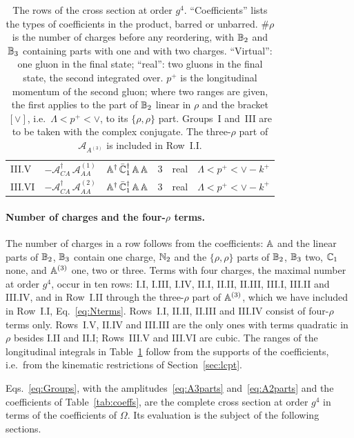 \begin{table}[t]
\begin{tabular}{@{}l l l c l l@{}}
III.V & $-\mathcal A^{\dagger}_{CA}\,\mathcal A^{(1)}_{AA}$ & $\mathbb{A}^\dagger\,\bar{\mathbb{C}}_1^\dagger\,\mathbb{A}\,\mathbb{A}$ & 3 & real & $\Lambda<p^+<\vee-k^+$\\
III.VI & $-\mathcal A^{\dagger}_{CA}\,\mathcal A^{(2)}_{AA}$ & $\mathbb{A}^\dagger\,\bar{\mathbb{C}}_1^\dagger\,\mathbb{A}\,\mathbb{A}$ & 3 & real & $\Lambda<p^+<\vee-k^+$\\
\bottomrule
\end{tabular}
\caption{The rows of the cross section at order $g^4$. ``Coefficients'' lists the types of coefficients in the product, barred or unbarred. $\#\rho$ is the number of charges before any reordering, with $\mathbb{B}_2$ and $\mathbb{B}_3$ containing parts with one and with two charges. ``Virtual'': one gluon in the final state; ``real'': two gluons in the final state, the second integrated over. $p^+$ is the longitudinal momentum of the second gluon; where two ranges are given, the first applies to the part of $\mathbb{B}_2$ linear in $\rho$ and the bracket $[\vee]$, i.e.\ $\Lambda<p^+<\vee$, to its $\{\rho,\rho\}$ part. Groups~I and~III are to be taken with the complex conjugate. The three-$\rho$ part of $\mathcal A_{A^{(3)}}$ is included in Row~I.I.}
\label{tab:rows}
\end{table}

\paragraph{Number of charges and the four-$\rho$ terms.} The number of charges in a row follows from the coefficients: $\mathbb{A}$ and the linear parts of $\mathbb{B}_2$, $\mathbb{B}_3$ contain one charge, $\mathbb{N}_2$ and the $\{\rho,\rho\}$ parts of $\mathbb{B}_2$, $\mathbb{B}_3$ two, $\mathbb{C}_1$ none, and $\mathbb{A}^{(3)}$ one, two or three. Terms with four charges, the maximal number at order $g^4$, occur in ten rows: I.I, I.III, I.IV, II.I, II.II, II.III, III.I, III.II and III.IV, and in Row~I.II through the three-$\rho$ part of $\mathbb{A}^{(3)}$, which we have included in Row~I.I, Eq.~\eqref{eq:Nterms}. Rows~I.I, II.II, II.III and III.IV consist of four-$\rho$ terms only. Rows~I.V, II.IV and III.III are the only ones with terms quadratic in $\rho$ besides I.II and II.I; Rows~III.V and III.VI are cubic. The ranges of the longitudinal integrals in Table~\ref{tab:rows} follow from the supports of the coefficients, i.e.\ from the kinematic restrictions of Section~\ref{sec:lcpt}.


Eqs.~\eqref{eq:Groups}, with the amplitudes~\eqref{eq:A3parts} and~\eqref{eq:A2parts} and the coefficients of Table~\ref{tab:coeffs}, are the complete cross section at order $g^4$ in terms of the coefficients of $\Omega$. Its evaluation is the subject of the following sections.
